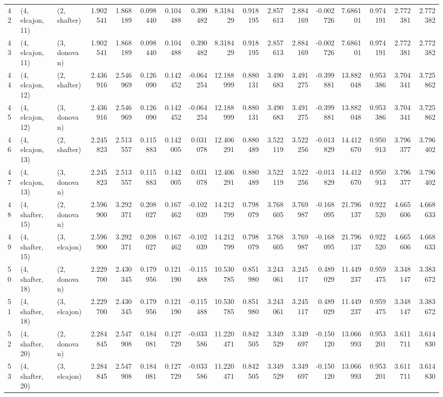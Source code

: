 \begin{tabular}{lllrrrrrrrrrrrrrr}
42 &  (4, elcajon, 11) &     (2, shafter) &  1.902541 &  1.868189 &   0.098440 &  0.104488 &  0.390482 &   8.318429 &  0.918195 &   2.857613 &  2.884169 & -0.002726 &   7.686101 &  0.974191 &  2.772381 &  2.772382 \\
43 &  (4, elcajon, 11) &     (3, donovan) &  1.902541 &  1.868189 &   0.098440 &  0.104488 &  0.390482 &   8.318429 &  0.918195 &   2.857613 &  2.884169 & -0.002726 &   7.686101 &  0.974191 &  2.772381 &  2.772382 \\
44 &  (4, elcajon, 12) &     (2, shafter) &  2.436916 &  2.546969 &   0.126090 &  0.142452 & -0.064254 &  12.188999 &  0.880131 &   3.490683 &  3.491275 & -0.399881 &  13.882048 &  0.953386 &  3.704341 &  3.725862 \\
45 &  (4, elcajon, 12) &     (3, donovan) &  2.436916 &  2.546969 &   0.126090 &  0.142452 & -0.064254 &  12.188999 &  0.880131 &   3.490683 &  3.491275 & -0.399881 &  13.882048 &  0.953386 &  3.704341 &  3.725862 \\
46 &  (4, elcajon, 13) &     (2, shafter) &  2.245823 &  2.513557 &   0.115883 &  0.142005 &  0.031078 &  12.406291 &  0.880489 &   3.522119 &  3.522256 & -0.013829 &  14.412670 &  0.950913 &  3.796377 &  3.796402 \\
47 &  (4, elcajon, 13) &     (3, donovan) &  2.245823 &  2.513557 &   0.115883 &  0.142005 &  0.031078 &  12.406291 &  0.880489 &   3.522119 &  3.522256 & -0.013829 &  14.412670 &  0.950913 &  3.796377 &  3.796402 \\
48 &  (4, shafter, 15) &     (2, donovan) &  2.596900 &  3.292371 &   0.208027 &  0.167462 & -0.102039 &  14.212799 &  0.798079 &   3.768605 &  3.769987 & -0.168095 &  21.796137 &  0.922520 &  4.665606 &  4.668633 \\
49 &  (4, shafter, 15) &     (3, elcajon) &  2.596900 &  3.292371 &   0.208027 &  0.167462 & -0.102039 &  14.212799 &  0.798079 &   3.768605 &  3.769987 & -0.168095 &  21.796137 &  0.922520 &  4.665606 &  4.668633 \\
50 &  (4, shafter, 18) &     (2, donovan) &  2.229700 &  2.430345 &   0.179956 &  0.121190 & -0.115488 &  10.530785 &  0.851980 &   3.243061 &  3.245117 &  0.489029 &  11.449237 &  0.959475 &  3.348147 &  3.383672 \\
51 &  (4, shafter, 18) &     (3, elcajon) &  2.229700 &  2.430345 &   0.179956 &  0.121190 & -0.115488 &  10.530785 &  0.851980 &   3.243061 &  3.245117 &  0.489029 &  11.449237 &  0.959475 &  3.348147 &  3.383672 \\
52 &  (4, shafter, 20) &     (2, donovan) &  2.284845 &  2.547908 &   0.184081 &  0.127729 & -0.033586 &  11.220471 &  0.842505 &   3.349529 &  3.349697 & -0.150120 &  13.066993 &  0.953201 &  3.611711 &  3.614830 \\
53 &  (4, shafter, 20) &     (3, elcajon) &  2.284845 &  2.547908 &   0.184081 &  0.127729 & -0.033586 &  11.220471 &  0.842505 &   3.349529 &  3.349697 & -0.150120 &  13.066993 &  0.953201 &  3.611711 &  3.614830 \\
\bottomrule
\end{tabular}
